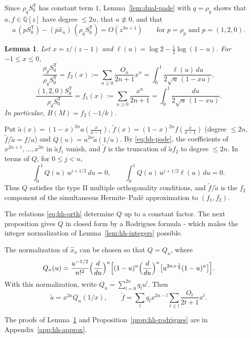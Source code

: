 \documentclass[oneside,english,11pt]{amsart}
\newtheorem{lemma}[thm]{Lemma}
\begin{document}
Since $\rho_qS_0^{\mathsf T}$ has constant term $1$, Lemma~\ref{lem:dual-pade} with $q=\rho_q$ shows that $a,f\in\mathbb Q[z]$ have degree $\le2n$, that $a\not\equiv0$, and that
\begin{equation}\label{eq:hh-pade}
 a\,(pS_0^{\mathsf T})-(p\hat x_n)\,(\rho_qS_0^{\mathsf T})=O(z^{3n+1})\qquad\text{for }p=\rho_p\text{ and }p=(1,2,0).
\end{equation}

\begin{lemma}\label{lem:hh-mobius}
Let $x=z/(z-1)$ and $\ell(u)=\log2-\frac12\log(1-u)$. For $-1\le x\le0$,
\[
 \frac{\rho_pS_0^{\mathsf T}}{\rho_qS_0^{\mathsf T}}=f_2(x):=\sum_{n\ge0}\frac{O_n}{2n+1}x^n=\int_0^1\frac{\ell(u)\,du}{2\sqrt u\,(1-xu)},
\]
\[
 \frac{(1,2,0)S_0^{\mathsf T}}{\rho_qS_0^{\mathsf T}}=f_1(x):=\sum_{n\ge0}\frac{x^n}{2n+1}=\int_0^1\frac{du}{2\sqrt u\,(1-xu)}.
\]
In particular, $B(M)=f_2(-1/k)$.
\end{lemma}

Put $\tilde a(x)=(1-x)^{2n}a(\frac x{x-1})$, $\tilde f(x)=(1-x)^{2n}f(\frac x{x-1})$ (degree $\le2n$, $\tilde f/\tilde a=f/a$) and
$Q(u)=u^{2n}\tilde a(1/u)$. By \eqref{eq:hh-pade}, the coefficients of $x^{2n+1},\dots,x^{3n}$ in $\tilde af_i$
vanish, and $\tilde f$ is the truncation of $\tilde af_2$ to degree $\le2n$. In terms of $Q$, for $0\le j<n$,
\begin{equation}\label{eq:hh-orth}
 \int_0^1Q(u)\,u^{j+1/2}\,du=0,\qquad\int_0^1Q(u)\,u^{j+1/2}\ell(u)\,du=0 .
\end{equation}
Thus $Q$ satisfies the type II multiple orthogonality conditions, and $\tilde f/\tilde a$ is the $f_2$ component of the simultaneous Hermite--Pad\'e approximation to $(f_1,f_2)$.

The relations \eqref{eq:hh-orth} determine $Q$ up to a constant factor. The next proposition gives $Q$ in closed form by a Rodrigues formula - which makes the integer normalization of Lemma~\ref{lem:hh-integers} possible.
\begin{proposition}
\label{prop:hh-rodrigues}
The normalization of $\hat x_n$ can be chosen so that $Q=Q_n$, where
\[
 Q_n(u)=\frac{u^{-1/2}}{n!^2}\Bigl(\frac d{du}\Bigr)^n\Bigl[(1-u)^n\Bigl(\frac d{du}\Bigr)^n\bigl[u^{2n+\frac12}(1-u)^n\bigr]\Bigr].
\]
With this normalization, write $Q_n=\sum_{l=0}^{2n}q_lu^l$. Then
\[
 \tilde a=x^{2n}Q_n(1/x),\qquad \tilde f=\sum_lq_lx^{2n-l}\sum_{t\le l}\frac{O_t}{2t+1}x^t .
\]
\end{proposition}%
%
\noindent The proofs of Lemma~\ref{lem:hh-mobius} and Proposition~\ref{prop:hh-rodrigues} are in Appendix~\ref{app:hh-approx}.
\end{document}
